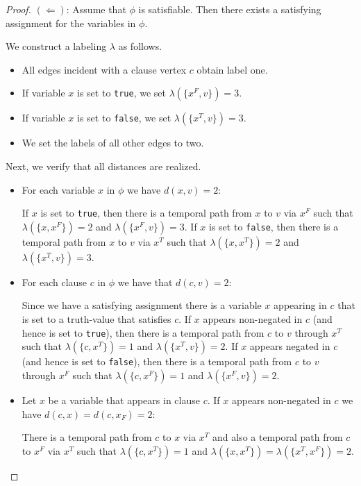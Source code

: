 \documentclass[11pt,a4paper]{article}
\theoremstyle{remark}
\theoremstyle{definition}
\begin{document}
\begin{proof}
$(\Leftarrow)$: Assume that $\phi$ is satisfiable. Then there exists a satisfying assignment for the variables in $\phi$.

We construct a labeling $\lambda$ as follows.
\begin{itemize}
    \item All edges incident with a clause vertex $c$ obtain label one.
    \item If variable $x$ is set to \texttt{true}, we set $\lambda(\{x^F,v\})=3$.
    \item If variable $x$ is set to \texttt{false}, we set $\lambda(\{x^T,v\})=3$.
    \item We set the labels of all other edges to two.
\end{itemize}

Next, we verify that all distances are realized.
\begin{itemize}
    \item For each variable $x$ in $\phi$ we have $d(x,v)=2$: 
    
    If $x$ is set to \texttt{true}, then there is a temporal path from $x$ to $v$ via $x^F$ such that $\lambda(\{x,x^F\})=2$ and $\lambda(\{x^F,v\})=3$. If $x$ is set to \texttt{false}, then there is a temporal path from $x$ to $v$ via $x^T$ such that $\lambda(\{x,x^T\})=2$ and $\lambda(\{x^T,v\})=3$.

    \item For each clause $c$ in $\phi$ we have that $d(c,v)=2$:

    Since we have a satisfying assignment there is a variable $x$ appearing in $c$ that is set to a truth-value that satisfies $c$. If $x$ appears non-negated in $c$ (and hence is set to \texttt{true}), then there is a temporal path from $c$ to $v$ through $x^T$ such that $\lambda(\{c,x^T\})=1$ and $\lambda(\{x^T,v\})=2$. If $x$ appears negated in $c$ (and hence is set to \texttt{false}), then there is a temporal path from $c$ to $v$ through $x^F$ such that $\lambda(\{c,x^F\})=1$ and $\lambda(\{x^F,v\})=2$.
    \item Let $x$ be a variable that appears in clause $c$.
    If $x$ appears non-negated in $c$ we have $d(c,x)=d(c,x_F)=2$:

    There is a temporal path from $c$ to $x$ via $x^T$ and also a temporal path from $c$ to $x^F$ via $x^T$ such that $\lambda(\{c,x^T\})=1$ and $\lambda(\{x,x^T\})=\lambda(\{x^T,x^F\})=2$.


\end{itemize}
\end{proof}
\end{document}
